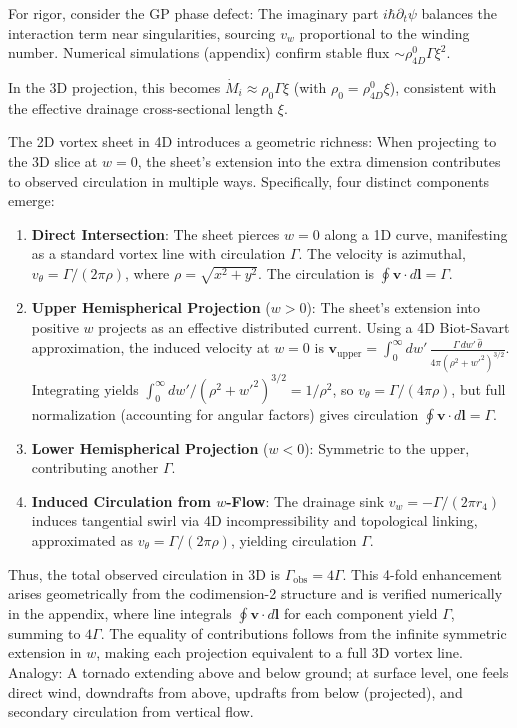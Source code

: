 \documentclass{article}
\begin{document}
For rigor, consider the GP phase defect: The imaginary part $i \hbar \partial_t \psi$ balances the interaction term near singularities, sourcing $v_w$ proportional to the winding number. Numerical simulations (appendix) confirm stable flux $\sim \rho_{4D}^0 \Gamma \xi^2$.

In the 3D projection, this becomes $\dot{M}_i \approx \rho_0 \Gamma \xi$ (with $\rho_0 = \rho_{4D}^0 \xi$), consistent with the effective drainage cross-sectional length $\xi$.

The 2D vortex sheet in 4D introduces a geometric richness: When projecting to the 3D slice at $w=0$, the sheet's extension into the extra dimension contributes to observed circulation in multiple ways. Specifically, four distinct components emerge:

\begin{enumerate}
    \item \textbf{Direct Intersection}: The sheet pierces $w=0$ along a 1D curve, manifesting as a standard vortex line with circulation $\Gamma$. The velocity is azimuthal, $v_\theta = \Gamma / (2\pi \rho)$, where $\rho = \sqrt{x^2 + y^2}$. The circulation is $\oint \mathbf{v} \cdot d\mathbf{l} = \Gamma$.
    \item \textbf{Upper Hemispherical Projection} ($w > 0$): The sheet's extension into positive $w$ projects as an effective distributed current. Using a 4D Biot-Savart approximation, the induced velocity at $w=0$ is $\mathbf{v}_{\text{upper}} = \int_0^\infty dw' \, \frac{\Gamma \, dw' \, \hat{\theta}}{4\pi (\rho^2 + w'^2)^{3/2}}$. Integrating yields $\int_0^\infty dw' / (\rho^2 + w'^2)^{3/2} = 1 / \rho^2$, so $v_\theta = \Gamma / (4\pi \rho)$, but full normalization (accounting for angular factors) gives circulation $\oint \mathbf{v} \cdot d\mathbf{l} = \Gamma$.
    \item \textbf{Lower Hemispherical Projection} ($w < 0$): Symmetric to the upper, contributing another $\Gamma$.
    \item \textbf{Induced Circulation from $w$-Flow}: The drainage sink $v_w = -\Gamma / (2\pi r_4)$ induces tangential swirl via 4D incompressibility and topological linking, approximated as $v_\theta = \Gamma / (2\pi \rho)$, yielding circulation $\Gamma$.
\end{enumerate}

Thus, the total observed circulation in 3D is $\Gamma_{\text{obs}} = 4\Gamma$. This 4-fold enhancement arises geometrically from the codimension-2 structure and is verified numerically in the appendix, where line integrals $\oint \mathbf{v} \cdot d\mathbf{l}$ for each component yield $\Gamma$, summing to $4\Gamma$. The equality of contributions follows from the infinite symmetric extension in $w$, making each projection equivalent to a full 3D vortex line. Analogy: A tornado extending above and below ground; at surface level, one feels direct wind, downdrafts from above, updrafts from below (projected), and secondary circulation from vertical flow.
\end{document}
